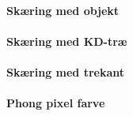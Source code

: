 \paragraph{Skæring med objekt}

\paragraph{Skæring med KD-træ}

\paragraph{Skæring med trekant}

\paragraph{Phong pixel farve}



